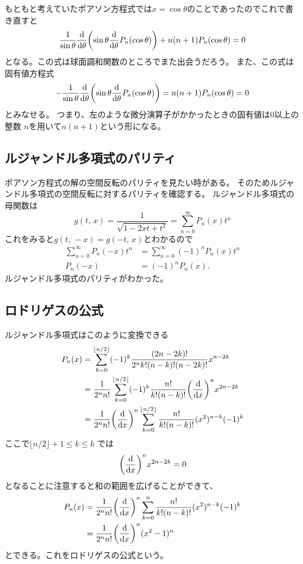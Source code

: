 \documentclass[../../master.tex]{subfiles}
\begin{document}
もともと考えていたポアソン方程式では\(x=\cos\theta\)のことであったのでこれで書き直すと
\begin{equation}
	\frac{1}{\sin\theta}\dv{\theta}\qty(\sin\theta\dv{\theta}P_n(\cos\theta)) + n(n+1)P_n(\cos\theta) =0 \label{eq:legendre_dif_eq2}
\end{equation}
となる。この式は球面調和関数のところでまた出会うだろう。
また、この式は固有値方程式
\begin{equation}
	-\frac{1}{\sin\theta}\dv{\theta}\qty(\sin\theta\dv{\theta}P_n(\cos\theta)) = n(n+1)P_n(\cos\theta) =0
\end{equation}
とみなせる。
つまり、左のような微分演算子がかかったときの固有値は0以上の整数
\(n\)を用いて\(n(n+1)\)という形になる。

\subsection{ルジャンドル多項式のパリティ}
ポアソン方程式の解の空間反転のパリティを見たい時がある。
そのためルジャンドル多項式の空間反転に対するパリティを確認する。
ルジャンドル多項式の母関数は
\begin{equation}
	g(t,\,x) = \frac{1}{\sqrt{1-2xt + t^2}} = \sum_{n=0}^{\infty}P_n(x)t^n
\end{equation}
これをみると\(g(t,\,-x)=g(-t,\,x)\)とわかるので
\begin{align}
	\sum_{n=0}^{\infty} P_n(-x)t^n & = \sum_{n=0}^{\infty} (-1)^n P_n(x)t^n \\
	P_n(-x)                        & = (-1)^n P_n(x).
\end{align}
ルジャンドル多項式のパリティがわかった。

\subsection{ロドリゲスの公式}
ルジャンドル多項式はこのように変換できる
\begin{equation}\begin{aligned}[b]
    P_n(x) & = \sum_{k=0}^{\lfloor n/2 \rfloor}(-1)^k \frac{(2n-2k)!}{2^n k!(n-k)!(n-2k)!}x^{n-2k}                \\
	       & =\frac{1}{2^n n!}\sum_{k=0}^{\lfloor n/2 \rfloor}(-1)^k \frac{n!}{k!(n-k)!}\qty(\dv{x})^nx^{2n-2k}   \\
	       & =\frac{1}{2^n n!}\qty(\dv{x})^n\sum_{k=0}^{\lfloor n/2 \rfloor} \frac{n!}{k!(n-k)!}(x^2)^{n-k}(-1)^k
\end{aligned}\end{equation}
ここで\(\lfloor n/2 \rfloor + 1 \leq k \leq k\) では
\begin{equation}
	\qty(\dv{x})^n x^{2n-2k} =0
\end{equation}
となることに注意すると和の範囲を広げることができて、
\begin{equation}\begin{aligned}[b]
    P_n(x) & = \frac{1}{2^n n!}\qty(\dv{x})^n\sum_{k=0}^{n} \frac{n!}{k!(n-k)!}(x^2)^{n-k}(-1)^k \\
	       & = \frac{1}{2^n n!}\qty(\dv{x})^n(x^2-1)^n
\end{aligned}\end{equation}
とできる。これをロドリゲスの公式という。
\end{document}
